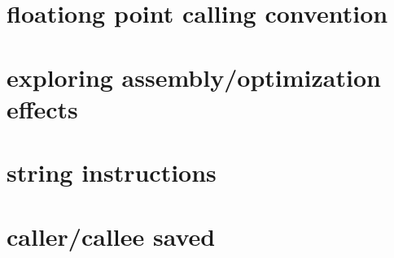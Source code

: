 \section{floationg point calling convention}

\section{exploring assembly/optimization effects}

\section{string instructions}

\section{caller/callee saved}

